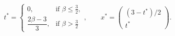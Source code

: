 \begin{equation}\label{eq:constrained}
t^*=\begin{cases}
0,&\text{if }\beta\le\frac32,\\[4pt]
\dfrac{2\beta-3}{3},&\text{if }\beta>\frac32
\end{cases},\qquad
x^*=\begin{pmatrix}(3-t^*)/2\\t^*\end{pmatrix}.
\end{equation}
